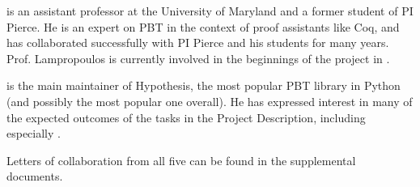 \smallskip{} is an assistant professor at the
University of Maryland and a former student of PI Pierce.  He is an expert on
PBT in the context of proof assistants like Coq, and has collaborated
successfully with PI Pierce and his students for many years. Prof. Lampropoulos
is currently involved in the beginnings of the project in
.

\smallskip{} is the main maintainer of
Hypothesis, the most popular PBT library in Python (and possibly the most
popular one overall). He has expressed interest in many of the expected outcomes
of the tasks in the Project Description, including especially
. 

\bigskip

\noindent Letters of collaboration from all five can be found in the supplemental
documents.
